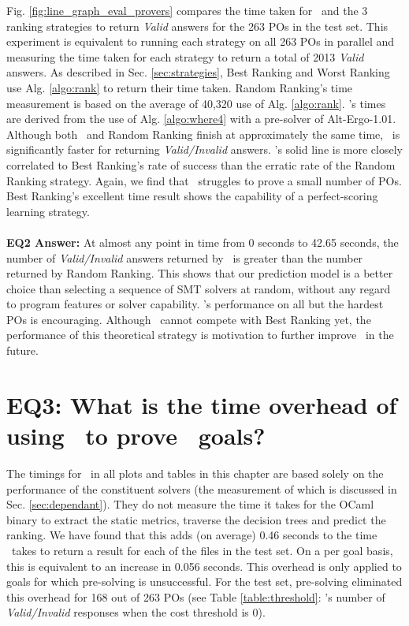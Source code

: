 Fig. \ref{fig:line_graph_eval_provers} compares the time taken for \where~and the 3 ranking strategies to return \textit{Valid} answers for the 263 POs in the test set.
This experiment is equivalent to running each strategy on all 263 POs in parallel and measuring the time taken for each strategy to return a total of 2013 \textit{Valid} answers.
As described in Sec. \ref{sec:strategies}, \textsf{Best Ranking} and \textsf{Worst Ranking} use Alg. \ref{algo:rank} to return their time taken.
\textsf{Random Ranking}'s time measurement is based on the average of 40,320 use of Alg. \ref{algo:rank}.
\where's times are derived from the use of Alg. \ref{algo:where4} with a pre-solver of Alt-Ergo-1.01. 
Although both \where~and \textsf{Random Ranking} finish at approximately the same time, \where~is significantly faster for returning \textit{Valid/Invalid} answers. 
\where's solid line is more closely correlated to \textsf{Best Ranking}'s rate of success than the erratic rate of the \textsf{Random Ranking} strategy. 
Again, we find that \where~struggles to prove a small number of POs.
\textsf{Best Ranking}'s excellent time result shows the capability of a perfect-scoring learning strategy. \\
\\
\textbf{EQ2 Answer:} At almost any point in time from 0 seconds to 42.65 seconds, the number of \textit{Valid/Invalid} answers returned by \where~is greater than the number returned by \textsf{Random Ranking}.
This shows that our prediction model is a better choice than selecting a sequence of SMT solvers at random, without any regard to program features or solver capability.
\where's performance on all but the hardest POs is encouraging.
Although \where~cannot compete with \textsf{Best Ranking} yet, the performance of this theoretical strategy is motivation to further improve \where~in the future.   



\section{EQ3: What is the time overhead of using \where~to prove \why~goals?}

The timings for \where~in all plots and tables in this chapter are based solely on the performance of the constituent solvers (the measurement of which is discussed in Sec. \ref{sec:dependant}). They do not measure the time it takes for the OCaml binary to extract the static metrics, traverse the decision trees and predict the ranking. 
We have found that this adds (on average) 0.46 seconds to the time \where~takes to return a result for each of the files in the test set. 
On a per goal basis, this is equivalent to an increase in 0.056 seconds.
This overhead is only applied to goals for which pre-solving is unsuccessful.  
For the test set, pre-solving eliminated this overhead for 168 out of 263 POs (see Table \ref{table:threshold}: \where's number of \textit{Valid/Invalid} responses when the cost threshold is 0).

